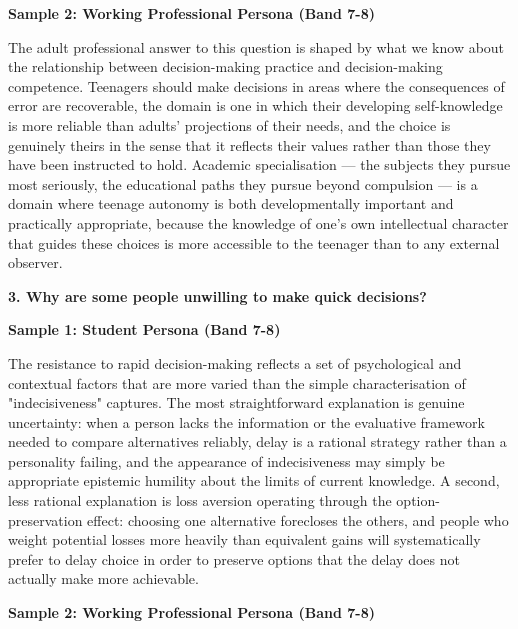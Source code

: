 \textbf{Sample 2: Working Professional Persona (Band 7-8)}

The adult professional answer to this question is shaped by what we know about the relationship between decision-making practice and decision-making competence. Teenagers should make decisions in areas where the consequences of error are recoverable, the domain is one in which their developing self-knowledge is more reliable than adults' projections of their needs, and the choice is genuinely theirs in the sense that it reflects their values rather than those they have been instructed to hold. Academic specialisation — the subjects they pursue most seriously, the educational paths they pursue beyond compulsion — is a domain where teenage autonomy is both developmentally important and practically appropriate, because the knowledge of one's own intellectual character that guides these choices is more accessible to the teenager than to any external observer.

\separator

\begin{ieltsquestion}
\textbf{3. Why are some people unwilling to make quick decisions?}
\end{ieltsquestion}
\textbf{Sample 1: Student Persona (Band 7-8)}

The resistance to rapid decision-making reflects a set of psychological and contextual factors that are more varied than the simple characterisation of "indecisiveness" captures. The most straightforward explanation is genuine uncertainty: when a person lacks the information or the evaluative framework needed to compare alternatives reliably, delay is a rational strategy rather than a personality failing, and the appearance of indecisiveness may simply be appropriate epistemic humility about the limits of current knowledge. A second, less rational explanation is loss aversion operating through the option-preservation effect: choosing one alternative forecloses the others, and people who weight potential losses more heavily than equivalent gains will systematically prefer to delay choice in order to preserve options that the delay does not actually make more achievable.

\textbf{Sample 2: Working Professional Persona (Band 7-8)}

